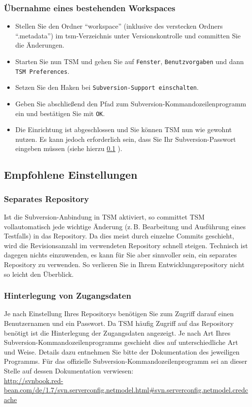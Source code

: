 \documentclass[11pt,a4paper,titlepage]{article}
\begin{document}
\subsubsection{Übernahme eines bestehenden Workspaces}
\begin{itemize}
 \item Stellen Sie den Ordner "`workspace"' (inklusive des verstecken Ordners "`.metadata"') im tsm-Verzeichnis unter Versionskontrolle und committen Sie die Änderungen.
 \item Starten Sie nun TSM und gehen Sie auf \texttt{Fenster}, \texttt{Benutzvorgaben} und dann \texttt{TSM Preferences}.
 \item Setzen Sie den Haken bei \texttt{Subversion-Support einschalten}.
 \item Geben Sie abschließend den Pfad zum Subversion-Kommandozeilenprogramm ein und bestätigen Sie mit \texttt{OK}.
 \item Die Einrichtung ist abgeschlossen und Sie können TSM nun wie gewohnt nutzen. Es kann jedoch erforderlich sein, dass Sie Ihr Subversion-Passwort eingeben müssen 
 (siehe hierzu \ref{subsec:EmpfohleneEinstellungenSVN} ).
\end{itemize}


\subsection{Empfohlene Einstellungen} \label{subsec:EmpfohleneEinstellungenSVN}
\subsubsection{Separates Repository}
Ist die Subversion-Anbindung in TSM aktiviert, so committet TSM vollautomatisch jede wichtige Änderung (z.\,B. Bearbeitung und Ausführung eines Testfalls) in das Repository.
Da dies meist durch einzelne Commits geschieht, wird die Revisionsanzahl im verwendeten Repository schnell steigen.
Technisch ist dagegen nichts einzuwenden, es kann für Sie aber sinnvoller sein, ein separates Repository zu verwenden.
So verlieren Sie in Ihrem Entwicklungsrepository nicht so leicht den Überblick.

\subsubsection{Hinterlegung von Zugangsdaten}
Je nach Einstellung Ihres Repositorys benötigen Sie zum Zugriff darauf einen Benutzernamen und ein Passwort.
Da TSM häufig Zugriff auf das Repository benötigt ist die Hinterlegung der Zugangsdaten angezeigt.
Je nach Art Ihres Subversion-Kommandozeilenprogramms geschieht dies auf unterschiedliche Art und Weise.
Details dazu entnehmen Sie bitte der Dokumentation des jeweiligen Programms.
Für das offizielle Subversion-Kommandozeilenprogramm sei an dieser Stelle auf dessen Dokumentation verwiesen: \\
\url{http://svnbook.red-bean.com/de/1.7/svn.serverconfig.netmodel.html#svn.serverconfig.netmodel.credcache}
\end{document}

